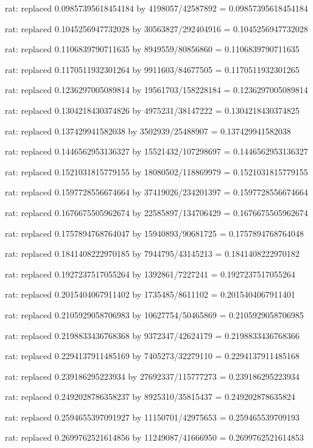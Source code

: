 \documentclass[a4paper,10pt]{article}
\begin{document}
\begin{eulernotebook}
\begin{eulercomment}
\begin{eulercomment}
\begin{eulercomment}
\begin{eulercomment}
\begin{eulercomment}
\begin{eulercomment}
\begin{eulercomment}
\begin{eulercomment}
\begin{eulercomment}
\begin{eulercomment}
\begin{eulercomment}
\begin{eulercomment}
\begin{eulercomment}
\begin{eulercomment}
\begin{eulercomment}
\begin{eulercomment}
\begin{euleroutput}
  rat: replaced 0.09857395618454184 by 4198057/42587892 = 0.09857395618454184
  
  rat: replaced 0.1045256947732028 by 30563827/292404916 = 0.1045256947732028
  
  rat: replaced 0.1106839790711635 by 8949559/80856860 = 0.1106839790711635
  
  rat: replaced 0.1170511932301264 by 9911603/84677505 = 0.1170511932301265
  
  rat: replaced 0.1236297005089814 by 19561703/158228184 = 0.1236297005089814
  
  rat: replaced 0.1304218430374826 by 4975231/38147222 = 0.1304218430374825
  
  rat: replaced 0.137429941582038 by 3502939/25488907 = 0.137429941582038
  
  rat: replaced 0.1446562953136327 by 15521432/107298697 = 0.1446562953136327
  
  rat: replaced 0.1521031815779155 by 18080502/118869979 = 0.1521031815779155
  
  rat: replaced 0.1597728556674664 by 37419026/234201397 = 0.1597728556674664
  
  rat: replaced 0.1676675505962674 by 22585897/134706429 = 0.1676675505962674
  
  rat: replaced 0.1757894768764047 by 15940893/90681725 = 0.1757894768764048
  
  rat: replaced 0.1841408222970185 by 7944795/43145213 = 0.1841408222970182
  
  rat: replaced 0.1927237517055264 by 1392861/7227241 = 0.1927237517055264
  
  rat: replaced 0.2015404067911402 by 1735485/8611102 = 0.2015404067911401
  
  rat: replaced 0.2105929058706983 by 10627754/50465869 = 0.2105929058706985
  
  rat: replaced 0.2198833436768368 by 9372347/42624179 = 0.2198833436768366
  
  rat: replaced 0.2294137911485169 by 7405273/32279110 = 0.2294137911485168
  
  rat: replaced 0.239186295223934 by 27692337/115777273 = 0.239186295223934
  
  rat: replaced 0.2492028786358237 by 8925310/35815437 = 0.249202878635824
  
  rat: replaced 0.2594655397091927 by 11150701/42975653 = 0.259465539709193
  
  rat: replaced 0.2699762521614856 by 11249087/41666950 = 0.2699762521614853
  

\end{euleroutput}
\end{eulercomment}
\end{eulercomment}
\end{eulercomment}
\end{eulercomment}
\end{eulercomment}
\end{eulercomment}
\end{eulercomment}
\end{eulercomment}
\end{eulercomment}
\end{eulercomment}
\end{eulercomment}
\end{eulercomment}
\end{eulercomment}
\end{eulercomment}
\end{eulercomment}
\end{eulercomment}
\end{eulernotebook}
\end{document}
